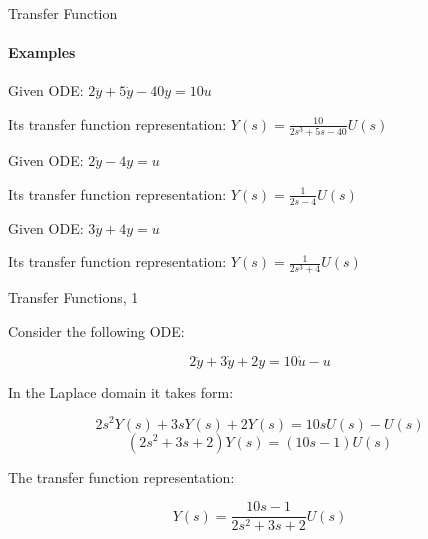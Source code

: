 \documentclass{beamer}
\begin{document}
\begin{frame}{Transfer Function}
\framesubtitle{Examples}
\begin{flushleft}

\begin{example}
Given ODE: $2 \dddot y + 5\dot y - 40 y = 10 u$

Its transfer function representation: 
$Y(s)  = \frac{10}{2 s^3 + 5 s - 40} U(s)$
\end{example}


\begin{example}
Given ODE: $2 \dot y - 4 y = u$

Its transfer function representation:  $Y(s) = \frac{1}{2 s - 4} U(s)$
\end{example}


\begin{example}
Given ODE: $3 \dddot y + 4y = u$

Its transfer function representation: $Y(s) = \frac{1}{2 s^3 + 4} U(s)$
\end{example}

\end{flushleft}
\end{frame}




\begin{frame}{Transfer Functions, 1}
\begin{flushleft}

Consider the following ODE:

\begin{equation}
2 \ddot y + 3 \dot y + 2 y = 10 \dot u - u
\end{equation}

In the Laplace domain it takes form:

\begin{equation}
2 s^2 Y(s) + 3s Y(s) + 2Y(s) = 10s U(s) - U(s)
\end{equation}
%
\begin{equation}
(2s^2 + 3s + 2) Y(s) = (10s - 1)U(s)
\end{equation}

The transfer function representation: 

\begin{equation}
Y(s) = \frac{10s - 1}{2s^2 + 3s + 2} U(s)
\end{equation}

\end{flushleft}
\end{frame}
\end{document}
